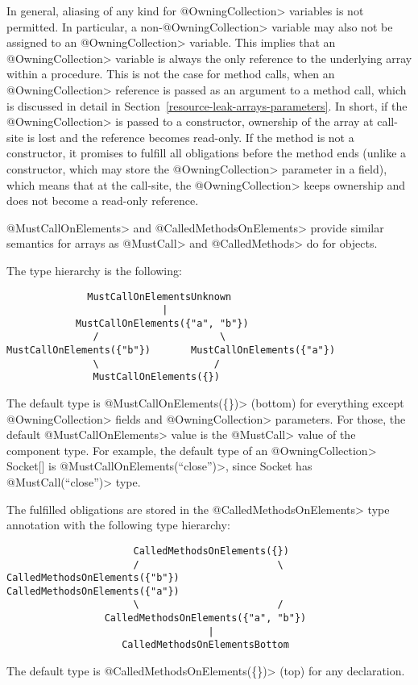 In general, aliasing of any kind for \<@OwningCollection> variables is not permitted. In particular, a non-\<@OwningCollection> variable may also not be assigned to an \<@OwningCollection> variable. This implies that an \<@OwningCollection> variable is always the only reference to the underlying array within a procedure. This is not the case for method calls, when an \<@OwningCollection> reference is passed as an argument to a method call, which is discussed in detail in Section~\ref{resource-leak-arrays-parameters}. In short, if the \<@OwningCollection> is passed to a constructor, ownership of the array at call-site is lost and the reference becomes read-only.
\noindent If the method is not a constructor, it promises to fulfill all obligations before the method ends (unlike a constructor, which may store the \<@OwningCollection> parameter in a field), which means that at the call-site, the \<@OwningCollection> keeps ownership and does not become a read-only reference.

\<@MustCallOnElements> and \<@CalledMethodsOnElements> provide similar semantics for arrays as \<@MustCall> and \<@CalledMethods> do for objects.

The type hierarchy is the following:

\begin{verbatim}
              MustCallOnElementsUnknown
                           |
            MustCallOnElements({"a", "b"})
               /                     \
MustCallOnElements({"b"})       MustCallOnElements({"a"})
               \                    /
               MustCallOnElements({})
\end{verbatim}
The default type is \<@MustCallOnElements(\{\})> (bottom) for everything except \<@OwningCollection> fields and \<@OwningCollection> parameters. For those, the default \<@MustCallOnElements> value is the \<@MustCall> value of the component type. For example, the default type of an \<@OwningCollection> Socket[] is \<@MustCallOnElements({``close''})>, since Socket has \<@MustCall(``close'')> type.

The fulfilled obligations are stored in the \<@CalledMethodsOnElements> type annotation with the following type hierarchy:
\begin{verbatim}
                      CalledMethodsOnElements({})
                      /                        \
CalledMethodsOnElements({"b"})           CalledMethodsOnElements({"a"})
                      \                        /
                 CalledMethodsOnElements({"a", "b"})
                                   |
                    CalledMethodsOnElementsBottom
\end{verbatim}
The default type is \<@CalledMethodsOnElements(\{\})> (top) for any declaration.

